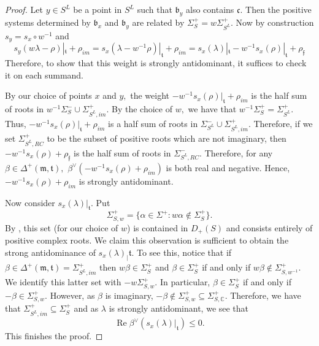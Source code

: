\documentclass[letterpaper,twosided,11pt]{article}
\theoremstyle{plain}
\theoremstyle{definition}
\theoremstyle{remark}
\newcommand{\C}{\mathbb{C}}
\newcommand{\comp}{\circ}
\newcommand{\lie}[1]{\mathfrak{#1}}
\begin{document}
\begin{proof}
    Let $ y\in S^L $ be a point in $ S^L $ such that $ \lie{b}_y $ also
    contains $ \lie{c}. $ Then the positive systems determined by $ \lie
    {b}_x $ and $ \lie{b}_y $ are related by $ \Sigma_S^+=w\Sigma_{S^L}^+.
    $ Now by construction $ s_y=s_x\comp w^{-1} $ and
    \[
        s_y(w\lambda-\rho)|_\lie{t}+\rho_{im}=s_x(\lambda-w^{-1}\rho)|_\lie
        {t}+\rho_{im}=s_x(\lambda)|_\lie{t}-w^{-1}s_x(\rho)|_\lie{t}+\rho_\lie
        {f}
    \]
    Therefore, to show that this weight is strongly antidominant, it
    suffices to check it on each summand.

    By our choice of points $ x $ and $ y, $ the weight $ -w^{-1}s_x(\rho)|_\lie
    {t}+\rho_{im} $ is the half sum of roots in $ w^{-1}\Sigma_{S}^-\cup
    \Sigma_{S^L,im}^+. $ By the choice of $ w, $ we have that $ w^{-1}\Sigma_S^+=\Sigma_
    {S^L}^+. $ Thus, $ -w^{-1}s_x(\rho)|_\lie{t}+\rho_{im} $ is a
    half sum of roots in $ \Sigma_{S^L}^-\cup \Sigma_{S^L,im}^+. $
    Therefore, if we set $ \Sigma_{S^L,RC}^+ $ to be the subset of
    positive roots which are not imaginary, then $ -w^{-1}s_x(\rho)+\rho_\lie
    {f} $ is the half sum of roots in $ \Sigma_{S^L,RC}^-. $ Therefore,
    for any $ \beta\in \Delta^+(\lie{m},\lie{t}), $ $ \beta^\vee(-w^{-1}s_x
    (\rho)+\rho_{im}) $ is both real and negative.  Hence, $ -w^{-1}s_x
    (\rho)+\rho_{im} $ is strongly antidominant.

    Now consider $ s_x(\lambda)|_\lie{t}. $ Put
    \[
        \Sigma_{S,w}^+=\{ \alpha\in \Sigma^+:  w\alpha\notin \Sigma_{S}^+\}.
    \]
    By
    \cite[Lemma 5.4]{Hecht2022}, this set (for our choice of $ w $) is
    contained in $ D_+(S) $ and consists entirely of positive complex
    roots.  We claim this observation is sufficient to obtain the strong
    antidominance of $ s_x(\lambda)_|\lie{t}. $ To see this, notice that
    if $ \beta\in \Delta^+(\lie{m},\lie{t})=\Sigma_{S^L,im}^+ $ then $ w\beta\in
    \Sigma_{S}^+ $ and $ \beta\in \Sigma_{S}^+ $ if and only if $ w\beta\notin
    \Sigma_{S,w^{-1}}^+. $ We identify this latter set with $ -w\Sigma_{S,w}^+.
    $ In particular, $ \beta\in \Sigma_{S}^+ $ if and only if $ -\beta\in
    \Sigma_{S,w}^+. $ However, as $ \beta $ is imaginary, $ -\beta\notin\Sigma_
    {S,w}^+\subseteq \Sigma_{S,\C}^+. $ Therefore, we have that $ \Sigma_
    {S^L,im}^+\subseteq \Sigma_{S}^+ $ and as $ \lambda $ is strongly
    antidominant, we see that
    \[
        \operatorname{Re}
        \beta^{\vee}(s_x(\lambda)|_\lie{t})\leq 0.
    \]
    This finishes the proof.
\end{proof}
\end{document}
